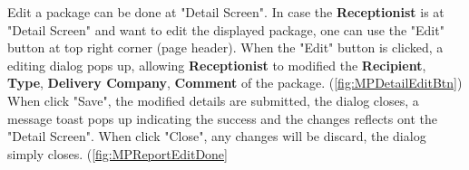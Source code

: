 Edit a package can be done at "Detail Screen".
In case the \textbf{Receptionist} is at "Detail Screen" and want to edit the displayed package, one can use the "Edit" button at top right corner (page header). 
When the "Edit" button is clicked, a editing dialog pops up, allowing \textbf{Receptionist} to modified the \textbf{Recipient}, \textbf{Type}, \textbf{Delivery Company}, \textbf{Comment} of the package. (\autoref{fig:MPDetailEditBtn})
When click "Save", the modified details are submitted, the dialog closes, a message toast pops up indicating the success and the changes reflects ont the "Detail Screen". When click "Close", any changes will be discard, the dialog simply closes.
(\autoref{fig:MPReportEditDone}

\begin{figure}[H]
	\centering
    \vspace{5pt}
    \hspace{5pt}

\end{figure}
